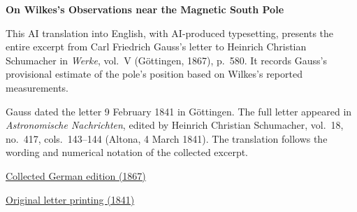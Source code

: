 \clearpage
\thispagestyle{empty}
\begin{center}\Large\textbf{On Wilkes’s Observations near the Magnetic South Pole}\end{center}

This AI translation into English, with AI-produced typesetting, presents the entire excerpt from Carl Friedrich Gauss’s letter to Heinrich Christian Schumacher in \textit{Werke}, vol.~V (Göttingen, 1867), p.~580. It records Gauss’s provisional estimate of the pole’s position based on Wilkes’s reported measurements.

Gauss dated the letter 9 February 1841 in Göttingen. The full letter appeared in \textit{Astronomische Nachrichten}, edited by Heinrich Christian Schumacher, vol.~18, no.~417, cols.~143--144 (Altona, 4 March 1841). The translation follows the wording and numerical notation of the collected excerpt.

\medskip\noindent
\href{https://gdz.sub.uni-goettingen.de/id/PPN236006339}{Collected German edition (1867)}\par
\noindent\href{https://archive.org/details/astronomischena00berlgoog/page/n80/mode/2up}{Original letter printing (1841)}
\clearpage
